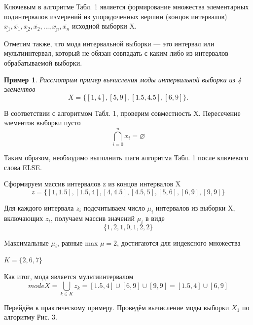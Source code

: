 \documentclass[a4paper,14pt]{article}
\newtheorem*{eg}{Пример}
\begin{document}
	Ключевым в алгоритме Табл. 1 является формирование множества элементарных подинтервалов измерений из упорядоченных вершин (концов интервалов) $\underline{x_1}, \overline{x_1}, \underline{x_2}, \overline{x_2}, ..., \underline{x_n}, \overline{x_n}$ исходной выборки X.
	
	Отметим также, что мода интервальной выборки — это интервал или мультиинтервал, который не обязан совпадать с каким-либо из интервалов обрабатываемой выборки.
	
	\begin{eg}
		Рассмотрим пример вычисления моды интервальной выборки
		из 4 элементов
		\begin{equation}
			X = \{[1, 4], [5, 9], [1.5, 4.5], [6, 9]\}.
		\end{equation}
	\end{eg}

	В соответствии с алгоритмом Табл. 1, проверим совместность X. Пересечение элементов выборки пусто
	\[
	\bigcap_{i = 0}^n x_i= \varnothing
	\]
	
	Таким образом, необходимо выполнить шаги алгоритма Табл. 1 после ключевого слова ELSE.
	
	Сформируем массив интервалов z из концов интервалов X
	\begin{equation}
		z = \{[1, 1.5], [1.5, 4], [4, 4.5], [4.5, 5], [5, 6], [6, 9], [9, 9]\}
	\end{equation}
	
	Для каждого интервала $z_i$ подсчитываем число $\mu_i$ интервалов из выборки X, включающих $z_i$, получаем массив значений $\mu_i$ в виде
	\begin{equation}
		\{1, 2, 1, 0, 1, 2, 2\}
	\end{equation}

	Mаксимальные $\mu_i$, равные max $\mu = 2$, достигаются для индексного множества
	\begin{center}
		$K = \{2, 6, 7\}$
	\end{center}

	Как итог, мода является мультиинтервалом
	\begin{equation}
		mode X = \bigcup_{k \in K} z_k =  [1.5, 4] \cup [6, 9] \cup [9, 9] = [1.5, 4] \cup [6, 9]
	\end{equation}

	Перейдём к практическому примеру. Проведём вычисление моды выборки $X_1$
	по алгоритму Рис. 3.
\end{document}
